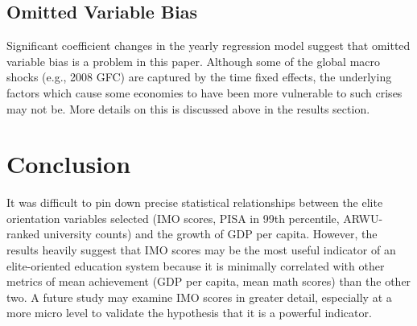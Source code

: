\documentclass[11pt]{article}
\begin{document}
\subsection{Omitted Variable Bias}
Significant coefficient changes in the yearly regression model suggest that omitted variable bias is a problem in this paper. Although some of the global macro shocks (e.g., 2008 GFC) are captured by the time fixed effects, the underlying factors which cause some economies to have been more vulnerable to such crises may not be. More details on this is discussed above in the results section.

\section{Conclusion}
It was difficult to pin down precise statistical relationships between the elite orientation variables selected (IMO scores, PISA in 99th percentile, ARWU-ranked university counts) and the growth of GDP per capita. However, the results heavily suggest that IMO scores may be the most useful indicator of an elite-oriented education system because it is minimally correlated with other metrics of mean achievement (GDP per capita, mean math scores) than the other two. A future study may examine IMO scores in greater detail, especially at a more micro level to validate the hypothesis that it is a powerful indicator.



\pagebreak
\nocite{*}
\printbibliography
\end{document}
